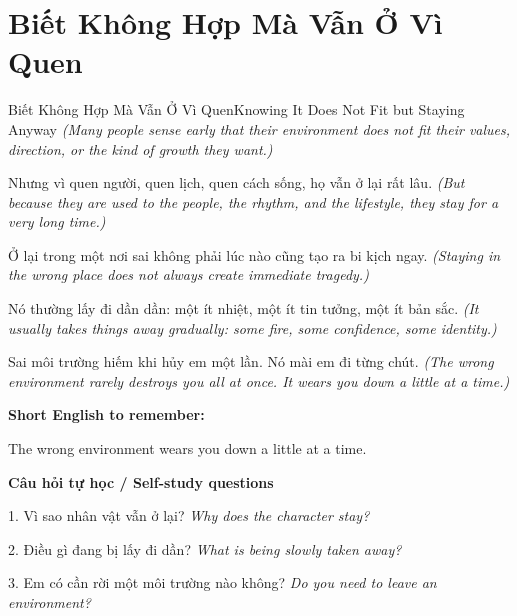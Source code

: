 \section{Biết Không Hợp Mà Vẫn Ở Vì Quen}
\begin{truyen}{Biết Không Hợp Mà Vẫn Ở Vì Quen}{Knowing It Does Not Fit but Staying Anyway}
\textit{(Many people sense early that their environment does not fit their values, direction, or the kind of growth they want.)}

Nhưng vì quen người, quen lịch, quen cách sống, họ vẫn ở lại rất lâu.
\textit{(But because they are used to the people, the rhythm, and the lifestyle, they stay for a very long time.)}

Ở lại trong một nơi sai không phải lúc nào cũng tạo ra bi kịch ngay.
\textit{(Staying in the wrong place does not always create immediate tragedy.)}

Nó thường lấy đi dần dần: một ít nhiệt, một ít tin tưởng, một ít bản sắc.
\textit{(It usually takes things away gradually: some fire, some confidence, some identity.)}

\end{truyen}

\begin{baihoc}
Sai môi trường hiếm khi hủy em một lần. Nó mài em đi từng chút.
\textit{(The wrong environment rarely destroys you all at once. It wears you down a little at a time.)}
\end{baihoc}

\begin{ghinhoanh}
\textbf{Short English to remember:}

The wrong environment wears you down a little at a time.

\end{ghinhoanh}

\begin{tuhocnhanh}
\textbf{Câu hỏi tự học / Self-study questions}

1. Vì sao nhân vật vẫn ở lại? \textit{Why does the character stay?}

2. Điều gì đang bị lấy đi dần? \textit{What is being slowly taken away?}

3. Em có cần rời một môi trường nào không? \textit{Do you need to leave an environment?}
\end{tuhocnhanh}
\ngancach


